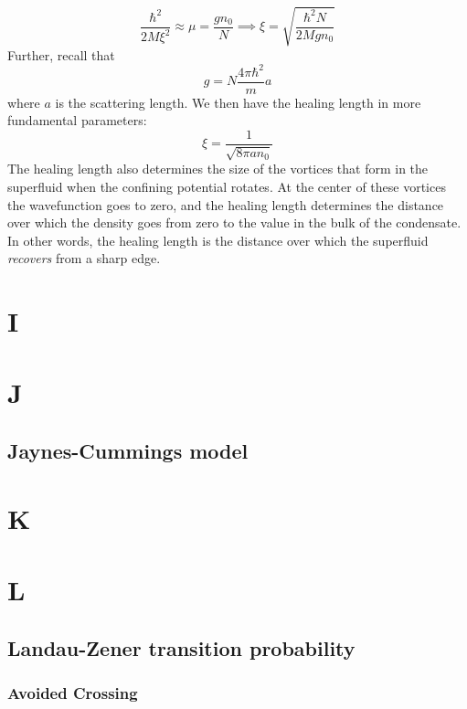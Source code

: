 \documentclass{book}
\theoremstyle{definition}
\newcommand{\f}[2]{\frac{#1}{#2}}
\begin{document}
\begin{equation*}
\f{\hbar^2}{2M\xi^2} \approx \mu = \f{gn_0}{N} \implies \xi = \sqrt{\f{\hbar^2 N}{2M g n_0}}
\end{equation*}
Further, recall that
\begin{equation*}
g = N \f{4\pi\hbar^2}{m}a
\end{equation*}
where $a$ is the scattering length. We then have the healing length in more fundamental parameters:
\begin{equation*}
\boxed{\xi = \f{1}{\sqrt{8\pi a n_0}}}
\end{equation*}
The healing length also determines the size of the vortices that form in the superfluid when the confining potential rotates. At the center of these vortices the wavefunction goes to zero, and the healing length determines the distance over which the density goes from zero to the value in the bulk of the condensate. In other words, the healing length is the distance over which the superfluid \textit{recovers} from a sharp edge.

\chapter*{I}
\chapter*{J}


\section*{Jaynes-Cummings model}

\chapter*{K}
\chapter*{L}


\section*{Landau-Zener transition probability}


\subsection*{Avoided Crossing}
\end{document}
